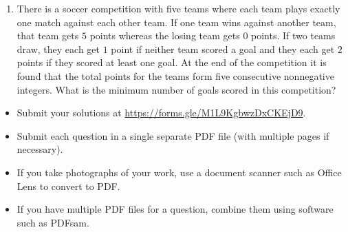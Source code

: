 \documentclass{article}
\begin{document}
\begin{enumerate}[1.]
\item %
There is a soccer competition with five teams where each team plays exactly one match against each other team.
If one team wins against another team, that team gets $5$ points whereas the losing team gets $0$ points.
If two teams draw, they each get $1$ point if neither team scored a goal and they each get $2$ points if they scored at least one goal.
At the end of the competition it is found that the total points for the teams form five consecutive nonnegative integers.
What is the minimum number of goals scored in this competition?

\end{enumerate}


\vfill
\begin{itemize}
	\item Submit your solutions at \url{https://forms.gle/M1L9KgbwzDxCKEjD9}.
	\item Submit each question in a single separate PDF file (with multiple pages if necessary).
	\item If you take photographs of your work, use a document scanner such as Office Lens to convert to PDF.
	\item If you have multiple PDF files for a question, combine them using software such as PDFsam.
\end{itemize}

\vfill
\centering
\begin{BVerbatim}
\end{BVerbatim}
\end{document}
